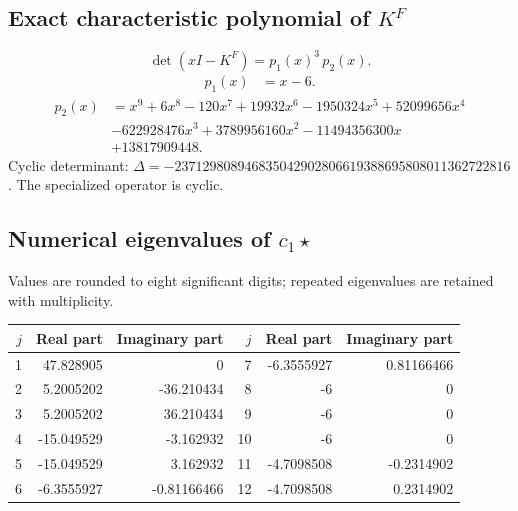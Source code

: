 \documentclass[10pt,a4paper]{article}
\begin{document}
\subsection*{Exact characteristic polynomial of $K^F$}
\[\det(xI-K^F)=p_{1}(x)^{3}\,p_{2}(x).\]
\[\begin{aligned}p_{1}(x)&=x - 6.\end{aligned}\]
\[\begin{aligned}p_{2}(x)&=x^{9} + 6 x^{8} - 120 x^{7} + 19932 x^{6} - 1950324 x^{5} + 52099656 x^{4}\\&- 622928476 x^{3} + 3789956160 x^{2} - 11494356300 x\\&+13817909448.\end{aligned}\]
Cyclic determinant: $\Delta=-237129808946835042902806619388695808011362722816$. The specialized operator is cyclic.
\subsection*{Numerical eigenvalues of $c_1\star$}
Values are rounded to eight significant digits; repeated eigenvalues are retained with multiplicity.
\begin{center}\small\begin{tabular}{rrr@{\qquad}rrr}\toprule $j$ & Real part & Imaginary part & $j$ & Real part & Imaginary part\\\midrule
1 & 47.828905 & 0 & 7 & -6.3555927 & 0.81166466\\
2 & 5.2005202 & -36.210434 & 8 & -6 & 0\\
3 & 5.2005202 & 36.210434 & 9 & -6 & 0\\
4 & -15.049529 & -3.162932 & 10 & -6 & 0\\
5 & -15.049529 & 3.162932 & 11 & -4.7098508 & -0.2314902\\
6 & -6.3555927 & -0.81166466 & 12 & -4.7098508 & 0.2314902\\
\bottomrule\end{tabular}\end{center}
\end{document}
